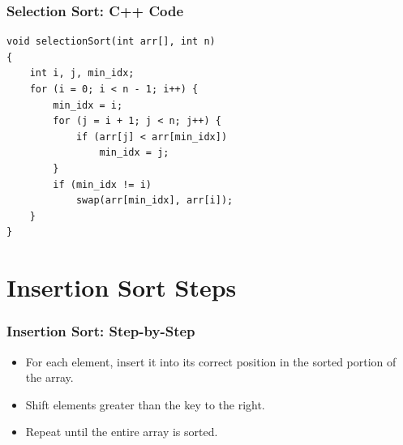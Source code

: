 \documentclass{beamer}
\begin{document}
\begin{frame}[c, fragile]
\frametitle{Selection Sort: C++ Code}

\begin{mybox}  %
\begin{verbatim}
void selectionSort(int arr[], int n) 
{ 
    int i, j, min_idx; 
    for (i = 0; i < n - 1; i++) { 
        min_idx = i; 
        for (j = i + 1; j < n; j++) { 
            if (arr[j] < arr[min_idx]) 
                min_idx = j; 
        } 
        if (min_idx != i) 
            swap(arr[min_idx], arr[i]); 
    } 
}
\end{verbatim}
\end{mybox}

\end{frame}
\section{Insertion Sort Steps}
\begin{frame}[c, fragile]
  \frametitle{Insertion Sort: Step-by-Step}

  \begin{itemize}
    \item For each element, insert it into its correct position in the sorted portion of the array.
    \item Shift elements greater than the key to the right.
    \item Repeat until the entire array is sorted.
  \end{itemize}

\end{frame}
\end{document}
